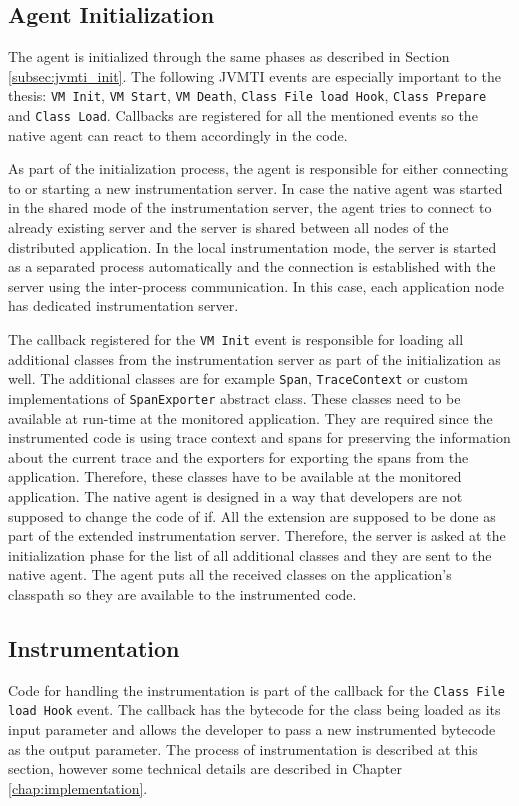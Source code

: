 \subsection{Agent Initialization}
\label{desing:native_initialization}
The agent is initialized through the same phases as described in Section \ref{subsec:jvmti_init}. The following JVMTI events are especially important to the thesis: \texttt{VM Init}, \texttt{VM Start}, \texttt{VM Death}, \texttt{Class File load Hook}, \texttt{Class Prepare} and \texttt{Class Load}. Callbacks are registered for all the mentioned events so the native agent can react to them accordingly in the code.

As part of the initialization process, the agent is responsible for either connecting to or starting a new instrumentation server. In case the native agent was started in the shared mode of the instrumentation server, the agent tries to connect to already existing server and the server is shared between all  nodes of the distributed application. In the local instrumentation mode, the server is started as a separated process automatically and the connection is established with the server using the inter-process communication. In this case, each application node has dedicated instrumentation server.

The callback registered for the \texttt{VM Init} event is responsible for loading all additional classes from the instrumentation server as part of the initialization as well. The additional classes are for example \texttt{Span}, \texttt{TraceContext} or custom implementations of \texttt{SpanExporter} abstract class. These classes need to be available at run-time at the monitored application. They are required since the instrumented code is using trace context and spans for preserving the information about the current trace and the exporters for exporting the spans from the application. Therefore, these classes have to be available at the monitored application. The native agent is designed in a way that developers are not supposed to change the code of if. All the extension are supposed to be done as part of the extended instrumentation server. Therefore, the server is asked at the initialization phase for the list of all additional classes and they are sent to the native agent. The agent puts all the received classes on the application's classpath so they are available to the instrumented code.

\subsection{Instrumentation}
Code for handling the instrumentation is part of the callback for the \texttt{Class File load Hook} event. The callback has the bytecode for the class being loaded as its input parameter and allows the developer to pass a new instrumented bytecode as the output parameter. The process of instrumentation is described at this section, however some technical details are described in Chapter \ref{chap:implementation}.

